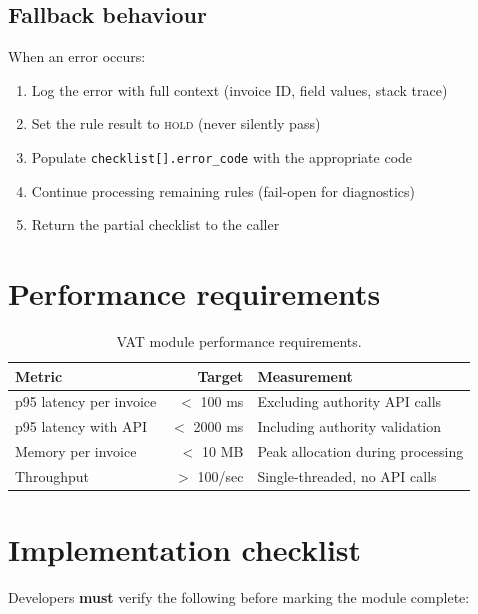\subsection{Fallback behaviour}

When an error occurs:

\begin{enumerate}
  \item Log the error with full context (invoice ID, field values, stack trace)
  \item Set the rule result to \textsc{hold} (never silently pass)
  \item Populate \texttt{checklist[].error\_code} with the appropriate code
  \item Continue processing remaining rules (fail-open for diagnostics)
  \item Return the partial checklist to the caller
\end{enumerate}

\section{Performance requirements}

\begin{table}[htbp]
\centering
\caption{VAT module performance requirements.}
\label{tab:vat-perf}
\footnotesize
\begin{tabularx}{\linewidth}{@{}l r X@{}}
\toprule
\textbf{Metric} & \textbf{Target} & \textbf{Measurement} \\ \midrule
p95 latency per invoice & $<$ 100 ms & Excluding authority API calls \\
p95 latency with API    & $<$ 2000 ms & Including authority validation \\
Memory per invoice      & $<$ 10 MB & Peak allocation during processing \\
Throughput              & $>$ 100/sec & Single-threaded, no API calls \\
\bottomrule
\end{tabularx}
\end{table}

\section{Implementation checklist}

Developers \textbf{must} verify the following before marking the module
complete:

